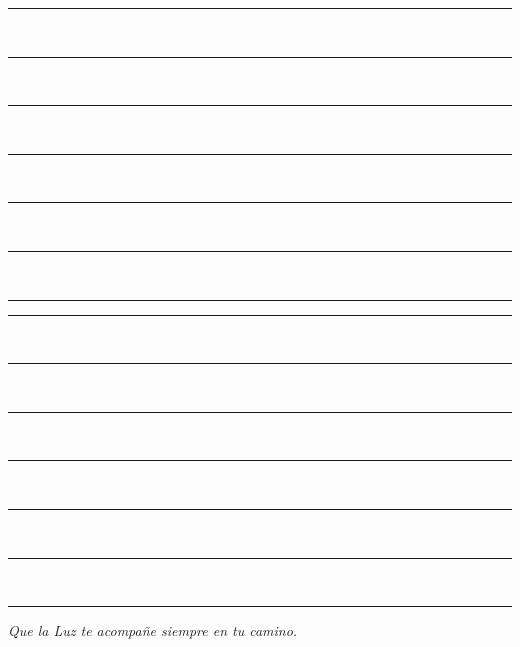 \documentclass[12pt,twoside,openright]{book}
\begin{document}
\newpage
\thispagestyle{plain}
\vspace*{1cm}
\noindent\rule{\textwidth}{0.4pt}\\[1.5cm]
\noindent\rule{\textwidth}{0.4pt}\\[1.5cm]
\noindent\rule{\textwidth}{0.4pt}\\[1.5cm]
\noindent\rule{\textwidth}{0.4pt}\\[1.5cm]
\noindent\rule{\textwidth}{0.4pt}\\[1.5cm]
\noindent\rule{\textwidth}{0.4pt}\\[1.5cm]
\noindent\rule{\textwidth}{0.4pt}

\newpage
\thispagestyle{plain}
\vspace*{1cm}
\noindent\rule{\textwidth}{0.4pt}\\[1.5cm]
\noindent\rule{\textwidth}{0.4pt}\\[1.5cm]
\noindent\rule{\textwidth}{0.4pt}\\[1.5cm]
\noindent\rule{\textwidth}{0.4pt}\\[1.5cm]
\noindent\rule{\textwidth}{0.4pt}\\[1.5cm]
\noindent\rule{\textwidth}{0.4pt}\\[1.5cm]
\noindent\rule{\textwidth}{0.4pt}

\cleardoublepage
\thispagestyle{empty}
\vspace*{6cm}
\begin{center}
    \large\textit{Que la Luz te acompañe siempre en tu camino.}
\end{center}
\end{document}
